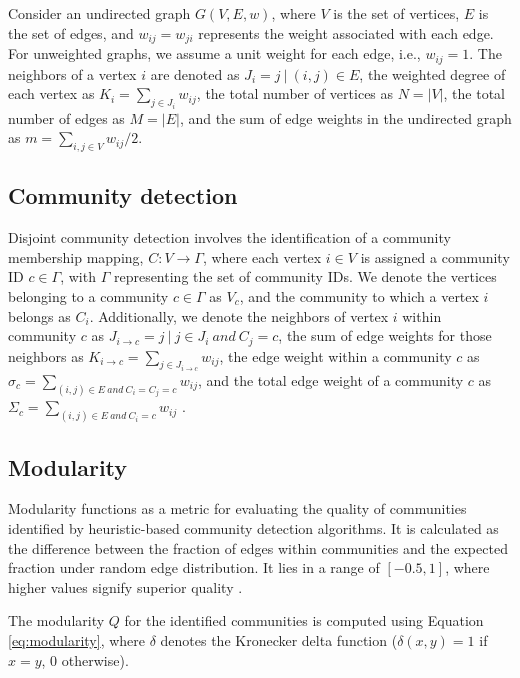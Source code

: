 Consider an undirected graph $G(V, E, w)$, where $V$ is the set of vertices, $E$ is the set of edges, and $w_{ij} = w_{ji}$ represents the weight associated with each edge. For unweighted graphs, we assume a unit weight for each edge, i.e., $w_{ij} = 1$. The neighbors of a vertex $i$ are denoted as $J_i = {j\ |\ (i, j) \in E}$, the weighted degree of each vertex as $K_i = \sum_{j \in J_i} w_{ij}$, the total number of vertices as $N = |V|$, the total number of edges as $M = |E|$, and the sum of edge weights in the undirected graph as $m = \sum_{i, j \in V} w_{ij}/2$.




\subsection{Community detection}

Disjoint community detection involves the identification of a community membership mapping, $C: V \rightarrow \Gamma$, where each vertex $i \in V$ is assigned a community ID $c \in \Gamma$, with $\Gamma$ representing the set of community IDs. We denote the vertices belonging to a community $c \in \Gamma$ as $V_c$, and the community to which a vertex $i$ belongs as $C_i$. Additionally, we denote the neighbors of vertex $i$ within community $c$ as $J_{i \rightarrow c} = {j\ |\ j \in J_i\ and\ C_j = c}$, the sum of edge weights for those neighbors as $K_{i \rightarrow c} = \sum_{j \in J_{i \rightarrow c}} w_{ij}$, the edge weight within a community $c$ as $\sigma_c = \sum_{(i, j) \in E\ and\ C_i = C_j = c} w_{ij}$, and the total edge weight of a community $c$ as $\Sigma_c = \sum_{(i, j) \in E\ and\ C_i = c} w_{ij}$ \cite{com-leskovec21}.




\subsection{Modularity}

Modularity functions as a metric for evaluating the quality of communities identified by heuristic-based community detection algorithms. It is calculated as the difference between the fraction of edges within communities and the expected fraction under random edge distribution. It lies in a range of $[-0.5, 1]$, where higher values signify superior quality \cite{com-brandes07}. The modularity $Q$ for the identified communities is computed using Equation \ref{eq:modularity}, where $\delta$ denotes the Kronecker delta function ($\delta (x,y)=1$ if $x=y$, $0$ otherwise).

